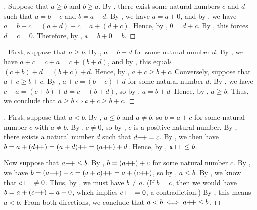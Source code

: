 \begin{proof}[]
  Suppose that \(a \geq b\) and \(b \geq a\).
  By , there exist some natural numbers \(c\) and \(d\) such that \(a = b + c\) and \(b = a + d\).
  By , we have \(a = a + 0\), and by , we have \(a = b + c = (a + d) + c = a + (d + c)\).
  Hence, by , \(0 = d + c\).
  By , this forces \(d = c = 0\).
  Therefore, by , \(a = b + 0 = b\).
\end{proof}

\begin{proof}[]
  First, suppose that \(a \geq b\).
  By , \(a = b + d\) for some natural number \(d\).
  By , we have \(a + c = c + a = c + (b + d)\), and by , this equals \((c + b) + d = (b + c) + d\).
  Hence, by , \(a + c \geq b + c\).
  Conversely, suppose that \(a + c \geq b + c\).
  By , \(a + c = (b + c) + d\) for some natural number \(d\).
  By , we have \(c + a = (c + b) + d = c + (b + d)\), so by , \(a = b + d\).
  Hence, by , \(a \geq b\).
  Thus, we conclude that \(a \geq b \iff a + c \geq b + c\).
\end{proof}

\begin{proof}[]
  First, suppose that \(a < b\).
  By , \(a \leq b\) and \(a \neq b\), so \(b = a + c\) for some natural number \(c\) with \(a \neq b\).
  By , \(c \neq 0\), so by , \(c\) is a positive natural number.
  By , there exists a natural number \(d\) such that \(d{+}\!{+} = c\).
  By , we then have \(b = a + (d{+}\!{+}) = (a + d){+}\!{+} = (a{+}\!{+}) + d\).
  Hence, by , \(a{+}\!{+} \leq b\).

  Now suppose that \(a{+}\!{+} \leq b\).
  By , \(b = (a{+}\!{+}) + c\) for some natural number \(c\).
  By , we have \(b = (a{+}\!{+}) + c = (a + c){+}\!{+} = a + (c{+}\!{+})\), so by , \(a \leq b\).
  By , we know that \(c{+}\!{+} \neq 0\).
  Thus, by , we must have \(b \neq a\).
  (If \(b = a\), then we would have \(b = a + (c{+}\!{+}) = a + 0\), which implies \(c{+}\!{+} = 0\), a contradiction.)
  By , this means \(a < b\).
  From both directions, we conclude that \(a < b \iff a{+}\!{+} \leq b\).
\end{proof}

